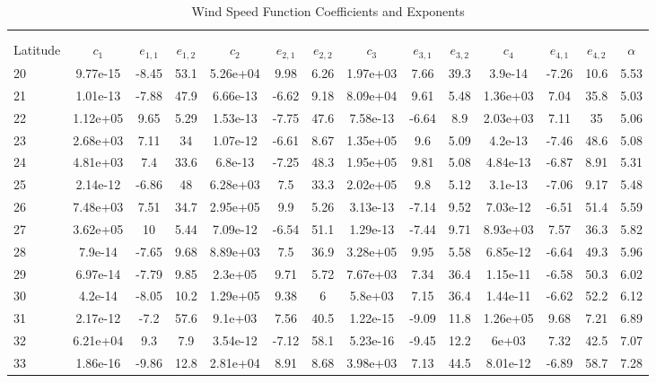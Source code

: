 \tiny
\begin{longtable}{lccccccccccccc} \\
\label{t:windvals} \\
    \caption{Wind Speed Function Coefficients and Exponents} \\
    \toprule
    \toprule
    Latitude & $c_1$ & $e_{1,1}$ & $e_{1,2}$ & $c_2$ & $e_{2,1}$ & $e_{2,2}$ & $c_3$ & $e_{3,1}$ & $e_{3,2}$ & $c_4$ & $e_{4,1}$ & $e_{4,2}$ & $\alpha$ \\
    \midrule
20 & 9.77e-15 & -8.45 & 53.1 & 5.26e+04 & 9.98 & 6.26 & 1.97e+03 & 7.66 & 39.3 & 3.9e-14 & -7.26 & 10.6 & 5.53\\
21 & 1.01e-13 & -7.88 & 47.9 & 6.66e-13 & -6.62 & 9.18 & 8.09e+04 & 9.61 & 5.48 & 1.36e+03 & 7.04 & 35.8 & 5.03\\
22 & 1.12e+05 & 9.65 & 5.29 & 1.53e-13 & -7.75 & 47.6 & 7.58e-13 & -6.64 & 8.9 & 2.03e+03 & 7.11 & 35 & 5.06\\
23 & 2.68e+03 & 7.11 & 34 & 1.07e-12 & -6.61 & 8.67 & 1.35e+05 & 9.6 & 5.09 & 4.2e-13 & -7.46 & 48.6 & 5.08\\
24 & 4.81e+03 & 7.4 & 33.6 & 6.8e-13 & -7.25 & 48.3 & 1.95e+05 & 9.81 & 5.08 & 4.84e-13 & -6.87 & 8.91 & 5.31\\
25 & 2.14e-12 & -6.86 & 48 & 6.28e+03 & 7.5 & 33.3 & 2.02e+05 & 9.8 & 5.12 & 3.1e-13 & -7.06 & 9.17 & 5.48\\
26 & 7.48e+03 & 7.51 & 34.7 & 2.95e+05 & 9.9 & 5.26 & 3.13e-13 & -7.14 & 9.52 & 7.03e-12 & -6.51 & 51.4 & 5.59\\
27 & 3.62e+05 & 10 & 5.44 & 7.09e-12 & -6.54 & 51.1 & 1.29e-13 & -7.44 & 9.71 & 8.93e+03 & 7.57 & 36.3 & 5.82\\
28 & 7.9e-14 & -7.65 & 9.68 & 8.89e+03 & 7.5 & 36.9 & 3.28e+05 & 9.95 & 5.58 & 6.85e-12 & -6.64 & 49.3 & 5.96\\
29 & 6.97e-14 & -7.79 & 9.85 & 2.3e+05 & 9.71 & 5.72 & 7.67e+03 & 7.34 & 36.4 & 1.15e-11 & -6.58 & 50.3 & 6.02\\
30 & 4.2e-14 & -8.05 & 10.2 & 1.29e+05 & 9.38 & 6 & 5.8e+03 & 7.15 & 36.4 & 1.44e-11 & -6.62 & 52.2 & 6.12\\
31 & 2.17e-12 & -7.2 & 57.6 & 9.1e+03 & 7.56 & 40.5 & 1.22e-15 & -9.09 & 11.8 & 1.26e+05 & 9.68 & 7.21 & 6.89\\
32 & 6.21e+04 & 9.3 & 7.9 & 3.54e-12 & -7.12 & 58.1 & 5.23e-16 & -9.45 & 12.2 & 6e+03 & 7.32 & 42.5 & 7.07\\
33 & 1.86e-16 & -9.86 & 12.8 & 2.81e+04 & 8.91 & 8.68 & 3.98e+03 & 7.13 & 44.5 & 8.01e-12 & -6.89 & 58.7 & 7.28\\

\end{longtable}
